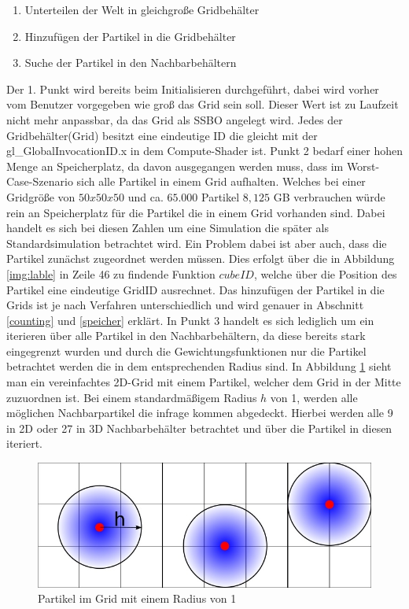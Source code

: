 \documentclass[intern,palatino]{cgBA}
\begin{document}
\begin{enumerate}
	\item Unterteilen der Welt in gleichgroße Gridbehälter
	\item Hinzufügen der Partikel in die Gridbehälter
	\item Suche der Partikel in den Nachbarbehältern 
\end{enumerate}

Der 1. Punkt wird bereits beim Initialisieren durchgeführt, dabei wird vorher vom Benutzer vorgegeben wie groß das Grid sein soll. Dieser Wert ist zu Laufzeit nicht mehr anpassbar, da das Grid als SSBO angelegt wird. Jedes der Gridbehälter(Grid) besitzt eine eindeutige ID die gleicht mit der gl\_GlobalInvocationID.x in dem Compute-Shader ist. 
\newline
Punkt 2 bedarf einer hohen Menge an Speicherplatz, da davon ausgegangen werden muss, dass im Worst-Case-Szenario sich alle Partikel in einem Grid aufhalten. Welches bei einer Gridgröße von $50x50x50$ und ca. $65.000$ Partikel $8,125$ GB verbrauchen würde rein an Speicherplatz für die Partikel die in einem Grid vorhanden sind. Dabei handelt es sich bei diesen Zahlen um eine Simulation die später als Standardsimulation betrachtet wird.
\newline
Ein Problem dabei ist aber auch, dass die Partikel zunächst zugeordnet werden müssen. Dies erfolgt über die in Abbildung \ref{img:lable} in Zeile 46 zu findende Funktion $cubeID$, welche über die Position des Partikel eine eindeutige GridID ausrechnet. Das hinzufügen der Partikel in die Grids ist je nach Verfahren unterschiedlich und wird genauer in Abschnitt \ref{counting} und \ref{speicher}  erklärt.
\newline
In Punkt 3 handelt es sich lediglich um ein iterieren über alle Partikel in den Nachbarbehältern, da diese bereits stark eingegrenzt wurden und durch die Gewichtungsfunktionen nur die Partikel betrachtet werden die in dem entsprechenden Radius sind.
\newline
In Abbildung \ref{img:grid} sieht man ein vereinfachtes 2D-Grid mit einem Partikel, welcher dem Grid in der Mitte zuzuordnen ist. Bei einem standardmäßigem Radius $h$ von 1, werden alle möglichen Nachbarpartikel die infrage kommen abgedeckt. Hierbei werden alle 9 in 2D oder 27 in 3D Nachbarbehälter betrachtet und über die Partikel in diesen iteriert.

\begin{figure}[H]
	\centering
	\includegraphics[width=1\columnwidth]{Bilder/grid.jpg}
	\caption{Partikel im Grid mit einem Radius von 1}
	\label{img:grid}
\end{figure}
\end{document}
